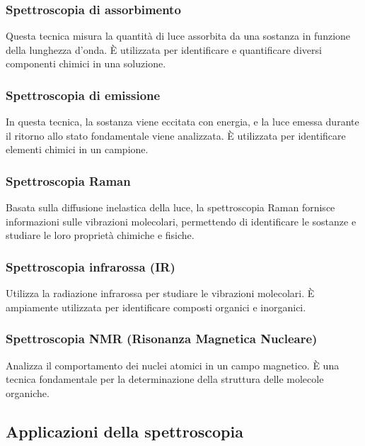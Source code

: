 \documentclass[12pt,a4paper]{report}
\begin{document}
\subsubsection{Spettroscopia di assorbimento}

Questa tecnica misura la quantità di luce assorbita da una sostanza in funzione della lunghezza d'onda. È utilizzata per identificare e quantificare diversi componenti chimici in una soluzione.

\subsubsection{Spettroscopia di emissione}

In questa tecnica, la sostanza viene eccitata con energia, e la luce emessa durante il ritorno allo stato fondamentale viene analizzata. È utilizzata per identificare elementi chimici in un campione.

\subsubsection{Spettroscopia Raman}

Basata sulla diffusione inelastica della luce, la spettroscopia Raman fornisce informazioni sulle vibrazioni molecolari, permettendo di identificare le sostanze e studiare le loro proprietà chimiche e fisiche.

\subsubsection{Spettroscopia infrarossa (IR)}

Utilizza la radiazione infrarossa per studiare le vibrazioni molecolari. È ampiamente utilizzata per identificare composti organici e inorganici.

\subsubsection{Spettroscopia NMR (Risonanza Magnetica Nucleare)}

Analizza il comportamento dei nuclei atomici in un campo magnetico. È una tecnica fondamentale per la determinazione della struttura delle molecole organiche.

\subsection{Applicazioni della spettroscopia}
\end{document}
